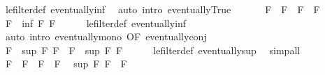 \begin{isabellebody}
\ le{\isacharunderscore}{\kern0pt}filter{\isacharunderscore}{\kern0pt}def\ eventually{\isacharunderscore}{\kern0pt}inf\ \isamarkupfalse%
\ {\isacharparenleft}{\kern0pt}auto\ intro{\isacharcolon}{\kern0pt}\ eventually{\isacharunderscore}{\kern0pt}True{\isacharparenright}{\kern0pt}\ \isacommand{{\isacharbraceright}{\kern0pt}}\isamarkupfalse%
\isanewline
\ \ \isacommand{{\isacharbraceleft}{\kern0pt}}\isamarkupfalse%
\ \isamarkupfalse%
\ {\isachardoublequoteopen}F\ {\isasymle}\ F{\isacharprime}{\kern0pt}{\isachardoublequoteclose}\ \ {\isachardoublequoteopen}F\ {\isasymle}\ F{\isacharprime}{\kern0pt}{\isacharprime}{\kern0pt}{\isachardoublequoteclose}\ \isamarkupfalse%
\ {\isachardoublequoteopen}F\ {\isasymle}\ inf\ F{\isacharprime}{\kern0pt}\ F{\isacharprime}{\kern0pt}{\isacharprime}{\kern0pt}{\isachardoublequoteclose}\isanewline
\ \ \ \ \isamarkupfalse%
\ le{\isacharunderscore}{\kern0pt}filter{\isacharunderscore}{\kern0pt}def\ eventually{\isacharunderscore}{\kern0pt}inf\isanewline
\ \ \ \ \isamarkupfalse%
\ {\isacharparenleft}{\kern0pt}auto\ intro{\isacharcolon}{\kern0pt}\ eventually{\isacharunderscore}{\kern0pt}mono\ {\isacharbrackleft}{\kern0pt}OF\ eventually{\isacharunderscore}{\kern0pt}conj{\isacharbrackright}{\kern0pt}{\isacharparenright}{\kern0pt}\ \isacommand{{\isacharbraceright}{\kern0pt}}\isamarkupfalse%
\isanewline
\ \ \isacommand{{\isacharbraceleft}{\kern0pt}}\isamarkupfalse%
\ \isamarkupfalse%
\ {\isachardoublequoteopen}F\ {\isasymle}\ sup\ F\ F{\isacharprime}{\kern0pt}{\isachardoublequoteclose}\ \ {\isachardoublequoteopen}F{\isacharprime}{\kern0pt}\ {\isasymle}\ sup\ F\ F{\isacharprime}{\kern0pt}{\isachardoublequoteclose}\isanewline
\ \ \ \ \isamarkupfalse%
\ le{\isacharunderscore}{\kern0pt}filter{\isacharunderscore}{\kern0pt}def\ eventually{\isacharunderscore}{\kern0pt}sup\ \isamarkupfalse%
\ simp{\isacharunderscore}{\kern0pt}all\ \isacommand{{\isacharbraceright}{\kern0pt}}\isamarkupfalse%
\isanewline
\ \ \isacommand{{\isacharbraceleft}{\kern0pt}}\isamarkupfalse%
\ \isamarkupfalse%
\ {\isachardoublequoteopen}F\ {\isasymle}\ F{\isacharprime}{\kern0pt}{\isacharprime}{\kern0pt}{\isachardoublequoteclose}\ \ {\isachardoublequoteopen}F{\isacharprime}{\kern0pt}\ {\isasymle}\ F{\isacharprime}{\kern0pt}{\isacharprime}{\kern0pt}{\isachardoublequoteclose}\ \isamarkupfalse%
\ {\isachardoublequoteopen}sup\ F\ F{\isacharprime}{\kern0pt}\ {\isasymle}\ F{\isacharprime}{\kern0pt}{\isacharprime}{\kern0pt}{\isachardoublequoteclose}\isanewline

\end{isabellebody}
